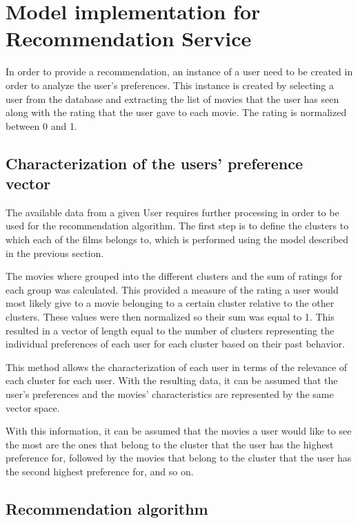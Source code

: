 \section{Model implementation for Recommendation Service}

In order to provide a recommendation, an instance of a user need to be created in order to analyze the user's preferences. This instance is created by selecting a user from the database and extracting the list of movies that the user has seen along with the rating that the user gave to each movie. The rating is normalized between 0 and 1.

\subsection{Characterization of the users' preference vector}

The available data from a given User requires further processing in order to be used for the recommendation algorithm. The first step is to define the clusters to which each of the films belongs to, which is performed using the model described in the previous section.

The movies where grouped into the different clusters and the sum of ratings for each group was calculated. This provided a measure of the rating a user would most likely give to a movie belonging to a certain cluster relative to the other clusters. These values were then normalized so their sum was equal to 1. This resulted in a vector of length equal to the number of clusters representing the individual preferences of each user for each cluster based on their past behavior.

This method allows the characterization of each user in terms of the relevance of each cluster for each user. With the resulting data, it can be assumed that the user's preferences and the movies' characteristics are represented by the same vector space.

With this information, it can be assumed that the movies a user would like to see the most are the ones that belong to the cluster that the user has the highest preference for, followed by the movies that belong to the cluster that the user has the second highest preference for, and so on.

\subsection{Recommendation algorithm}

